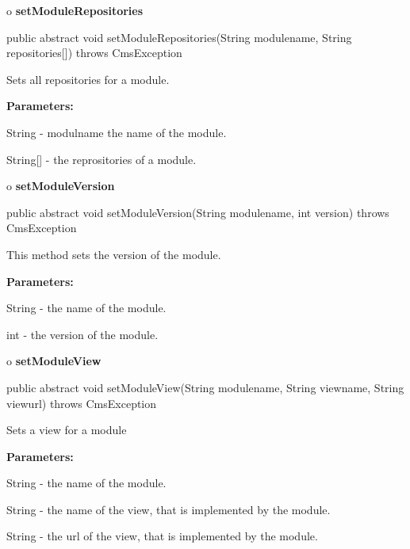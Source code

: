 o {\bf setModuleRepositories} 

\begin{PRE}
 public abstract void setModuleRepositories(String modulename,
                                            String repositories[]) throws CmsException
\end{PRE}

\begin{description}
\htmlDD Sets all repositories for a module. 

\begin{description}
\item {\bf Parameters:}  

String - modulname the name of the module.  

String[] - the reprositories of a module.  
\end{description}

\end{description}

o {\bf setModuleVersion} 

\begin{PRE}
 public abstract void setModuleVersion(String modulename,
                                       int version) throws CmsException
\end{PRE}

\begin{description}
\htmlDD This method sets the version of the module. 

\begin{description}
\item {\bf Parameters:}  

String - the name of the module.  

int - the version of the module.  
\end{description}

\end{description}

o {\bf setModuleView} 

\begin{PRE}
 public abstract void setModuleView(String modulename,
                                    String viewname,
                                    String viewurl) throws CmsException
\end{PRE}

\begin{description}
\htmlDD Sets a view for a module 

\begin{description}
\item {\bf Parameters:}  

String - the name of the module.  

String - the name of the view, that is implemented by the module.  

String - the url of the view, that is implemented by the module.  
\end{description}

\end{description}

